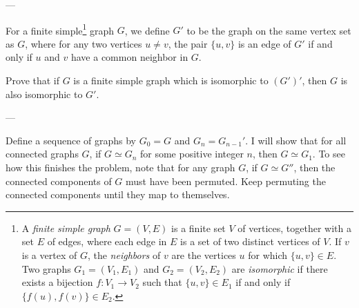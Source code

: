 
---

For a finite simple\footnote{A \emph{finite simple graph} $G=(V,E)$ is a finite set $V$ of vertices, together with a set $E$ of edges, where each edge in $E$ is a set of two distinct vertices of $V$. If $v$ is a vertex of $G$, the \emph{neighbors} of $v$ are the vertices $u$ for which $\{u,v\}\in E$. Two graphs $G_1=(V_1,E_1)$ and $G_2=(V_2,E_2)$ are \emph{isomorphic} if there exists a bijection $f:V_1\to V_2$ such that $\{u,v\}\in E_1$ if and only if $\{f(u),f(v)\}\in E_2$.} graph $G$, we define $G'$ to be the graph on the same vertex set as $G$, where for any two vertices $u\ne v$, the pair $\{u,v\}$ is an edge of $G'$ if and only if $u$ and $v$ have a common neighbor in $G$.

Prove that if $G$ is a finite simple graph which is isomorphic to $(G')'$, then $G$ is also isomorphic to $G'$.

---

Define a sequence of graphs by $G_0=G$ and $G_n=G_{n-1}'$. I will show that for all connected graphs $G$, if $G\simeq G_n$ for some positive integer $n$, then $G\simeq G_1$. To see how this finishes the problem, note that for any graph $G$, if $G\simeq G''$, then the connected components of $G$ must have been permuted. Keep permuting the connected components until they map to themselves.

